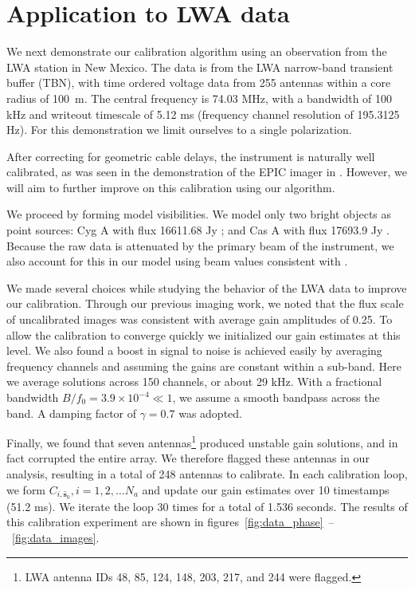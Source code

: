 \documentclass[a4paper,fleqn,usenatbib]{mnras}
\begin{document}
\section{Application to LWA data}\label{sec:data}
We next demonstrate our calibration algorithm using an observation from the LWA station in New Mexico. The data is from the LWA narrow-band transient buffer (TBN), with time ordered voltage data from 255 antennas within a core radius of 100~m. The central frequency is 74.03 MHz, with a bandwidth of 100 kHz and writeout timescale of 5.12 ms (frequency channel resolution of 195.3125 Hz). For this demonstration we limit ourselves to a single polarization.

After correcting for geometric cable delays, the instrument is naturally well calibrated, as was seen in the demonstration of the EPIC imager in \citealt{thy15c}. However, we will aim to further improve on this calibration using our algorithm.

We proceed by forming model visibilities. We model only two bright objects as point sources: Cyg A with flux 16611.68 Jy \citep{coh07}; and Cas A with flux 17693.9 Jy \citep{kas07}. Because the raw data is attenuated by the primary beam of the instrument, we also account for this in our model using beam values consistent with \cite{hic12}.

We made several choices while studying the behavior of the LWA data to improve our calibration. Through our previous imaging work, we noted that the flux scale of uncalibrated images was consistent with average gain amplitudes of 0.25. To allow the calibration to converge quickly we initialized our gain estimates at this level. We also found a boost in signal to noise is achieved easily by averaging frequency channels and assuming the gains are constant within a sub-band. Here we average solutions across 150 channels, or about 29 kHz. With a fractional bandwidth $B/f_0 = 3.9 \times 10^{-4} \ll 1$, we assume a smooth bandpass across the band. 
A damping factor of $\gamma = 0.7$ was adopted.

Finally, we found that seven antennas\footnote{LWA antenna IDs 48, 85, 124, 148, 203, 217, and 244 were flagged.} produced unstable gain solutions, and in fact corrupted the entire array. We therefore flagged these antennas in our analysis, resulting in a total of 248 antennas to calibrate. In each calibration loop, we form $C_{i,\hat{\boldsymbol{s}}_0}, i=1,2,\ldots N_a$ and update our gain estimates over 10 timestamps (51.2 ms). We iterate the loop 30 times for a total of 1.536 seconds. The results of this calibration experiment are shown in figures~\ref{fig:data_phase}~--~\ref{fig:data_images}.
\end{document}
